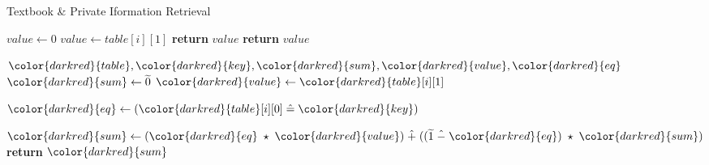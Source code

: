 \begin{algorithm}[H]
\caption{Textbook \& Private Iformation Retrieval}\label{a:pir}
\begin{algorithmic}[1]
\renewcommand{\algorithmicrequire}{\textbf{Private Vars:}}

    \State $value \gets 0$
            \State $value \gets table[i][1]$
            \State \textbf{return} {$value$} 
        \EndIf
    \EndFor
    \State \textbf{return} {$value$} 
\EndProcedure

\begin{spacing}{0.5}
\end{spacing}

\Require ${\color{darkred}{table}}, {\color{darkred}{key}}, {\color{darkred}{sum}}, {\color{darkred}{value}}, {\color{darkred}{eq}}$
    \State ${\color{darkred}{sum}} \gets \enc{0}$
        \State ${\color{darkred}{value}} \gets {\color{darkred}{table}}[i][1]$
    
        \State ${\color{darkred}{eq}} \gets ({\color{darkred}{table}}[i][0] \heq {\color{darkred}{key}})$
        
        \State ${\color{darkred}{sum}} \gets ({\color{darkred}{eq}} \hmul {\color{darkred}{value}}) \hplus ((\enc{1} \hminus {\color{darkred}{eq}}) \hmul {\color{darkred}{sum}})$
    \EndFor
    \State \textbf{return} {${\color{darkred}{sum}}$}
\EndProcedure

\end{algorithmic}
\end{algorithm}
